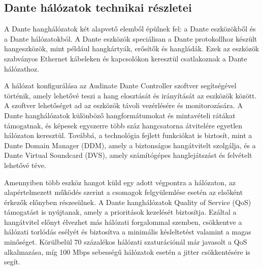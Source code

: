 \subsection{Dante hálózatok technikai részletei}
A Dante hanghálózatok két alapvető elemből épülnek fel: a Dante eszközökből és a Dante hálózatokból. 
A Dante eszközök speciálisan a Dante protokollhoz készült hangeszközök, mint például hangkártyák, erősítők és hangládák. 
Ezek az eszközök szabványos Ethernet kábeleken és kapcsolókon keresztül csatlakoznak a Dante hálózathoz. 

A hálózat konfigurálása az Audinate Dante Controller szoftver segítségével történik, amely lehetővé teszi a hang elosztását és 
irányítását az eszközök között. A szoftver lehetőséget ad az eszközök távoli vezérlésére és monitorozására. 
A Dante hanghálózatok különböző hangformátumokat és mintavételi rátákat támogatnak, és képesek egyszerre több száz hangcsatorna 
átvitelére egyetlen hálózaton keresztül. Továbbá, a technológia fejlett funkciókat is biztosít, mint a Dante Domain Manager (DDM), 
amely a biztonságos hangátvitelt szolgálja, és a Dante Virtual Soundcard (DVS), amely számítógépes hanglejátszást és felvételt 
lehetővé téve.

Amennyiben több eszköz hangot küld egy adott végpontra a hálózaton, az alapértelmezett működés szerint a csomagok felgyülemlése 
esetén az elsőként érkezők előnyben részesülnek. A Dante hanghálózatok Quality of Service (QoS) támogatást is nyújtanak, 
amely a prioritások kezelését biztosítja. Ezáltal a hangátvitel előnyt élvezhet más hálózati forgalommal szemben, csökkentve 
a hálózati torlódás esélyét és biztosítva a minimális késleltetést valamint a magas minőséget. Körülbelül 70 százalékos 
hálózati szaturációnál már javasolt a QoS alkalmazása, míg 100 Mbps sebességű hálózatok esetén a jitter csökkentésére is 
segít.
